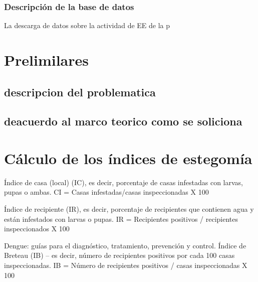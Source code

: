 \documentclass[
  letterpaper,
]{scrbook}
\begin{document}
\subsection{Descripción de la base de
datos}\label{descripciuxf3n-de-la-base-de-datos}

La descarga de datos sobre la actividad de EE de la p


\chapter{Prelimilares}\label{prelimilares}

\section{descripcion del
problematica}\label{descripcion-del-problematica}

\section{deacuerdo al marco teorico como se
soliciona}\label{deacuerdo-al-marco-teorico-como-se-soliciona}

\section{}\label{section-1}


\chapter{Cálculo de los índices de
estegomía}\label{cuxe1lculo-de-los-uxedndices-de-estegomuxeda}

Índice de casa (local) (IC), es decir, porcentaje de casas infestadas
con larvas, pupas o ambas. CI = Casas infestadas/casas inspeccionadas X
100

Índice de recipiente (IR), es decir, porcentaje de recipientes que
contienen agua y están infestados con larvas o pupas. IR = Recipientes
positivos / recipientes inspeccionados X 100

Dengue: guías para el diagnóstico, tratamiento, prevención y control.
Índice de Breteau (IB) -- es decir, número de recipientes positivos por
cada 100 casas inspeccionadas. IB = Número de recipientes positivos /
casas inspeccionadas X 100

\section{}\label{section-2}
\end{document}
